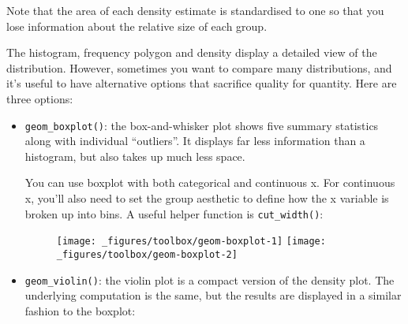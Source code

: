 Note that the area of each density estimate is standardised to one so
that you lose information about the relative size of each group.

The histogram, frequency polygon and density display a detailed view of
the distribution. However, sometimes you want to compare many
distributions, and it's useful to have alternative options that
sacrifice quality for quantity. Here are three options:

\begin{itemize}
\item
  \texttt{geom\_boxplot()}: the box-and-whisker plot shows five summary
  statistics along with individual ``outliers''. It displays far less
  information than a histogram, but also takes up much less space.
   

  You can use boxplot with both categorical and continuous x. For
  continuous x, you'll also need to set the group aesthetic to define
  how the x variable is broken up into bins. A useful helper function is
  \texttt{cut\_width()}: 

\begin{Shaded}
\begin{Highlighting}[]
\StringTok{ }
\StringTok{  }\NormalTok{()}
\StringTok{ }
\StringTok{  }\NormalTok{(}\NormalTok{(} \NormalTok{))) +}\StringTok{ }
\StringTok{  }\NormalTok{(}\NormalTok{, }\NormalTok{)}
\end{Highlighting}
\end{Shaded}

  \begin{figure}[H]
    \texttt{[image: \_figures/toolbox/geom-boxplot-1]}%
    \texttt{[image: \_figures/toolbox/geom-boxplot-2]}
  \end{figure}
\item
  \texttt{geom\_violin()}: the violin plot is a compact version of the
  density plot. The underlying computation is the same, but the results
  are displayed in a similar fashion to the boxplot:
   


\end{itemize}
